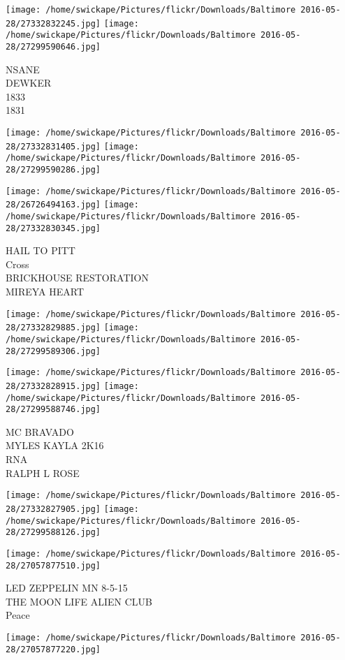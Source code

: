 \documentclass[10pt,letterpaper]{article}
\begin{document}
\texttt{[image: /home/swickape/Pictures/flickr/Downloads/Baltimore 2016-05-28/27332832245.jpg]}
\texttt{[image: /home/swickape/Pictures/flickr/Downloads/Baltimore 2016-05-28/27299590646.jpg]}

NSANE\\
DEWKER\\
1833\\
1831
\pagebreak

\texttt{[image: /home/swickape/Pictures/flickr/Downloads/Baltimore 2016-05-28/27332831405.jpg]}
\texttt{[image: /home/swickape/Pictures/flickr/Downloads/Baltimore 2016-05-28/27299590286.jpg]}

\texttt{[image: /home/swickape/Pictures/flickr/Downloads/Baltimore 2016-05-28/26726494163.jpg]}
\texttt{[image: /home/swickape/Pictures/flickr/Downloads/Baltimore 2016-05-28/27332830345.jpg]}

HAIL TO PITT\\
Cross\\
BRICKHOUSE RESTORATION\\
MIREYA HEART
\pagebreak

\texttt{[image: /home/swickape/Pictures/flickr/Downloads/Baltimore 2016-05-28/27332829885.jpg]}
\texttt{[image: /home/swickape/Pictures/flickr/Downloads/Baltimore 2016-05-28/27299589306.jpg]}

\texttt{[image: /home/swickape/Pictures/flickr/Downloads/Baltimore 2016-05-28/27332828915.jpg]}
\texttt{[image: /home/swickape/Pictures/flickr/Downloads/Baltimore 2016-05-28/27299588746.jpg]}

MC BRAVADO\\
MYLES KAYLA 2K16\\
RNA\\
RALPH L ROSE
\pagebreak

\texttt{[image: /home/swickape/Pictures/flickr/Downloads/Baltimore 2016-05-28/27332827905.jpg]}
\texttt{[image: /home/swickape/Pictures/flickr/Downloads/Baltimore 2016-05-28/27299588126.jpg]}

\texttt{[image: /home/swickape/Pictures/flickr/Downloads/Baltimore 2016-05-28/27057877510.jpg]}

LED ZEPPELIN MN 8{-}5{-}15\\
THE MOON LIFE ALIEN CLUB\\
Peace
\pagebreak

\texttt{[image: /home/swickape/Pictures/flickr/Downloads/Baltimore 2016-05-28/27057877220.jpg]}
\end{document}
